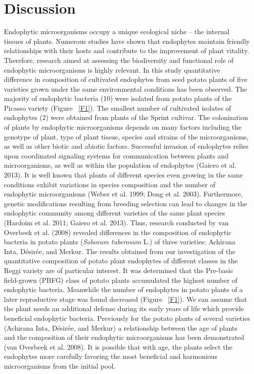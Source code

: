 \documentclass[sn-mathphys,Numbered]{sn-jnl}%
\theoremstyle{thmstyleone}%
\theoremstyle{thmstyletwo}%
\theoremstyle{thmstylethree}%
\begin{document}
\section*{Discussion}

Endophytic microorganisms occupy a unique ecological niche – the internal tissues of plants. Numerous studies have shown that endophytes maintain friendly relationships with their hosts and contribute to the improvement of plant vitality. Therefore, research aimed at assessing the biodiversity and functional role of endophytic microorganisms is highly relevant.
In this study quantitative difference in composition of cultivated endophytes from seed potato plants of five varieties grown under the same environmental conditions has been observed. The majority of endophytic bacteria (10) were isolated from potato plants of the Picasso variety (Figure ~\ref{F1}). The smallest number of cultivated isolates of endophytes (2) were obtained from plants of the Sprint cultivar. The colonization of plants by endophytic microorganisms depends on many factors including the genotype of plant,  type of plant tissue, species and strains of the microorganisms, as well as other biotic and abiotic factors. Successful invasion of endophytes relies upon coordinated signaling systems for communication between plants and microorganisms, as well as within the population of endophytes (Gaiero et al. 2013). It is well known that plants of different species even growing in the same conditions exhibit variations in species composition and the number of endophytic microorganisms (Weber et al. 1999; Dong et al. 2003). Furthermore, genetic modifications resulting from breeding selection can lead to changes in the endophytic community among different varieties of the same plant species (Hardoim et al. 2011; Gaiero et al. 2013). Thus, research conducted by van Overbeek et al.  (2008) revealed differences in the composition of endophytic bacteria in potato plants (\textit{Solanum tuberosum} L.) of three varieties: Achirana Inta, Désirée, and Merkur.
The results obtained from our investigation of the quantitative composition of potato plant endophytes of different classes in the Reggi variety are of particular interest. It was determined that the Pre-basic field-grown (PBFG) class of potato plants accumulated the highest number of endophytic bacteria. Meanwhile the number of endophytes in potato plants of a later reproductive stage was found decreased (Figure ~\ref{F1}). We can assume that the plant needs an additional defense during its early years of life which provide beneficial endophytic bacteria. Previously for the potato plants of several varieties (Achirana Inta, Désirée, and Merkur) a relationship between the age of plants and  the composition of their endophytic microorganisms has been demonstrated (van Overbeek et al. 2008). It is possible that  with age, the plants select the endophytes more carefully  favoring the most beneficial and harmonious microorganisms from the initial pool.
\end{document}
